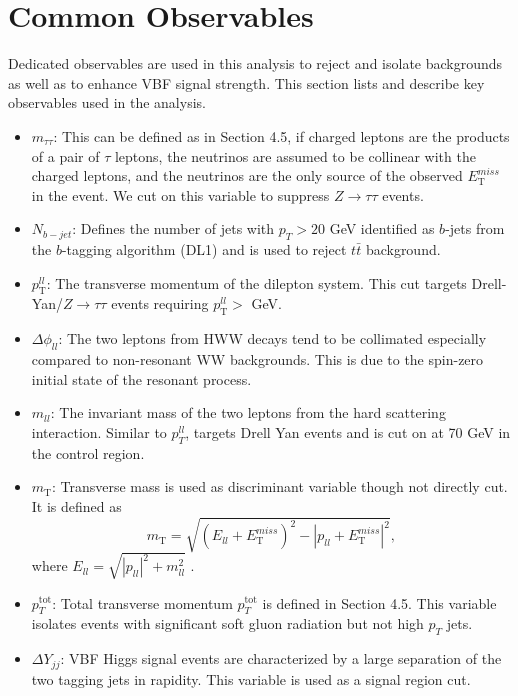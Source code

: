\section{Common Observables}

Dedicated observables are used in this analysis to reject and isolate backgrounds as well as to enhance VBF signal strength. This section lists and describe key observables used in the analysis.

\begin{itemize}
\item $m_{\tau \tau}$: This can be defined as in Section 4.5, if charged leptons are the products of a pair of $\tau$ leptons, the neutrinos are assumed to be collinear with the charged leptons, and the neutrinos are the only source of the observed $E_\mathrm{{T}}^{miss}$ in the event. We cut on this variable to suppress $Z\rightarrow\tau\tau$  events. 
\item $N_{b-jet}$: Defines the number of jets with $p_T >20$ GeV identified as $b$-jets from the $b$-tagging algorithm (DL1) and is used to reject $t\bar{t}$ background.
\item $p_\mathrm{{T}}^{ll}$: The transverse momentum of the dilepton system. This cut targets Drell-Yan/$Z\rightarrow\tau\tau$ events requiring $p_{\text{T}}^{ll}>$ GeV. 
\item $\Delta \phi_{ll}$: The two leptons from HWW decays tend to be collimated especially compared to non-resonant WW backgrounds. This is due to the spin-zero initial state of the resonant process. 
\item $m_{ll}$: The invariant mass of the two leptons from the hard scattering interaction. Similar to $p_T^{ll}$, targets Drell Yan events and is cut on at 70 GeV in the control region.
\item $m_\mathrm{{T}}$: Transverse mass is used as discriminant variable though not directly cut. It is defined as
\begin{equation}
m_\mathrm{{T}} = \sqrt{ {(E_{ll} + E_\mathrm{{T}}^{miss})}^2 - {|p_{ll} + E_\mathrm{{T}}^{miss}|}^2 },
\end{equation}
  where $E_{ll} = \sqrt{|p_{ll}|^2 + m_{ll}^2 }$ .
\item $p_T^\mathrm{tot}$:
Total transverse momentum $p_T^\mathrm{tot}$ is defined in Section 4.5. This variable isolates events with significant soft gluon radiation but not high $p_T$ jets.
\item  $\Delta Y_{jj}$: VBF Higgs signal events are characterized by a large separation of the two tagging jets in rapidity. This variable is used as a signal region cut. 

\end{itemize}
